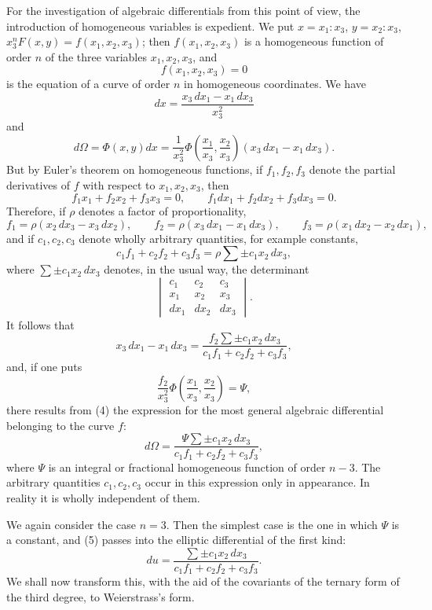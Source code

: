 \documentclass[11pt]{article}
\begin{document}
For the investigation of algebraic differentials from this point of view, the introduction of homogeneous variables is expedient. We put $x=x_1:x_3$, $y=x_2:x_3$, $x_3^nF(x,y)=f(x_1,x_2,x_3)$; then $f(x_1,x_2,x_3)$ is a homogeneous function of order $n$ of the three variables $x_1,x_2,x_3$, and
\begin{equation}
f(x_1,x_2,x_3)=0
\tag{3}
\end{equation}
is the equation of a curve of order $n$ in homogeneous coordinates. We have
\[
dx=\frac{x_3\,dx_1-x_1\,dx_3}{x_3^2}
\]
and
\begin{equation}
d\Omega=\Phi(x,y)dx=\frac1{x_3^2}\Phi\left(\frac{x_1}{x_3},\frac{x_2}{x_3}\right)(x_3\,dx_1-x_1\,dx_3).
\tag{4}
\end{equation}
But by Euler's theorem on homogeneous functions, if $f_1,f_2,f_3$ denote the partial derivatives of $f$ with respect to $x_1,x_2,x_3$, then
\[
f_1x_1+f_2x_2+f_3x_3=0,
\qquad
f_1dx_1+f_2dx_2+f_3dx_3=0.
\]
Therefore, if $\rho$ denotes a factor of proportionality,
\[
f_1=\rho(x_2\,dx_3-x_3\,dx_2),\qquad
f_2=\rho(x_3\,dx_1-x_1\,dx_3),\qquad
f_3=\rho(x_1\,dx_2-x_2\,dx_1),
\]
and if $c_1,c_2,c_3$ denote wholly arbitrary quantities, for example constants,
\[
c_1f_1+c_2f_2+c_3f_3=\rho\sum\pm c_1x_2\,dx_3,
\]
where $\sum\pm c_1x_2\,dx_3$ denotes, in the usual way, the determinant
\[
\begin{vmatrix}
c_1&c_2&c_3\\
x_1&x_2&x_3\\
dx_1&dx_2&dx_3
\end{vmatrix}.
\]
It follows that
\[
x_3\,dx_1-x_1\,dx_3=\frac{f_2\sum\pm c_1x_2\,dx_3}{c_1f_1+c_2f_2+c_3f_3},
\]
and, if one puts
\[
\frac{f_2}{x_3^2}\Phi\left(\frac{x_1}{x_3},\frac{x_2}{x_3}\right)=\Psi,
\]
there results from (4) the expression for the most general algebraic differential belonging to the curve $f$:
\begin{equation}
d\Omega=\frac{\Psi\sum\pm c_1x_2\,dx_3}{c_1f_1+c_2f_2+c_3f_3},
\tag{5}
\end{equation}
where $\Psi$ is an integral or fractional homogeneous function of order $n-3$. The arbitrary quantities $c_1,c_2,c_3$ occur in this expression only in appearance. In reality it is wholly independent of them.

We again consider the case $n=3$. Then the simplest case is the one in which $\Psi$ is a constant, and (5) passes into the elliptic differential of the first kind:
\begin{equation}
du=\frac{\sum\pm c_1x_2\,dx_3}{c_1f_1+c_2f_2+c_3f_3}.
\tag{6}
\end{equation}
We shall now transform this, with the aid of the covariants of the ternary form of the third degree, to Weierstrass's form.
\end{document}
